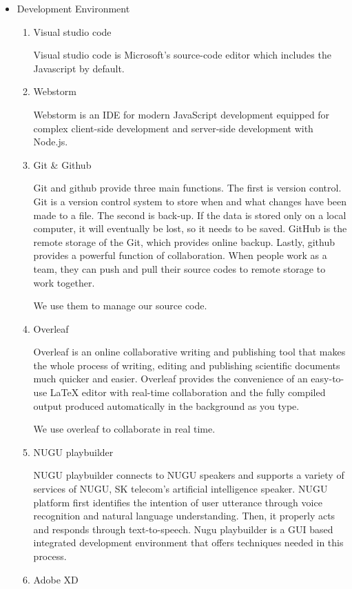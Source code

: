 \documentclass[conference]{IEEEtran}
\begin{document}
\begin{itemize}

    \item Development Environment 
    \begin{enumerate}
    \setlength{\parindent}{2ex}
        \item Visual studio code
        
        Visual studio code is Microsoft's source-code editor which includes the Javascript by default.
        \item Webstorm
        
        Webstorm is an IDE for modern JavaScript development equipped for complex client-side development and server-side development with Node.js.
        \item Git \& Github
        
        Git and github provide three main functions. The first is version control. Git is a version control system to store when and what changes have been made to a file. The second is back-up. If the data is stored only on a local computer, it will eventually be lost, so it needs to be saved. GitHub is the remote storage of the Git, which provides online backup. Lastly, github provides a powerful function of collaboration. When people work as a team, they can push and pull their source codes to remote storage to work together. 
        
        We use them to manage our source code. 
        \item Overleaf
        
        Overleaf is an online collaborative writing and publishing tool that makes the whole process of writing, editing and publishing scientific documents much quicker and easier. Overleaf provides the convenience of an easy-to-use LaTeX editor with real-time collaboration and the fully compiled output produced automatically in the background as you type. 
        
        We use overleaf to collaborate in real time.\cite{b7} 
        \item NUGU playbuilder
        
        NUGU playbuilder connects to NUGU speakers and supports a variety of services of NUGU, SK telecom’s artificial intelligence speaker. NUGU platform first identifies the intention of user utterance through voice recognition and natural language understanding. Then, it properly acts and responds through text-to-speech. Nugu playbuilder is a GUI based integrated development environment that offers techniques needed in this process.  
        \item Adobe XD
        

\end{enumerate}
\end{itemize}
\end{document}
